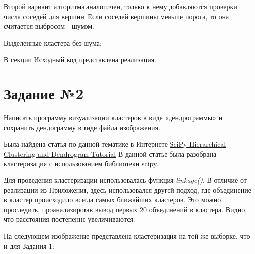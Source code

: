 \documentclass{article} %
\begin{document}
Второй вариант алгоритма аналогичен,
только к нему добавляются проверки числа соседей для вершин.
Если соседей вершины меньше порога, то она считается выбросом - шумом.

\clearpage

Выделенные кластера без шума:

\noindent{}

В секции Исходный код представлена реализация.

\section{Задание №2}

Написать программу визуализации кластеров в виде «дендрограммы» и сохранить
дендограмму в виде файла изображения.

Была найдена статья по данной тематике в Интернете
\href{https://joernhees.de/blog/2015/08/26/scipy-hierarchical-clustering-and-dendrogram-tutorial/}
{SciPy Hierarchical Clustering and Dendrogram Tutorial}
В данной статье была разобрана кластеризация с использованием библиотеки scipy.

Для проведения кластеризации использовалась функция \textit{linkage()}.
В отличие от реализации из Приложения,
здесь использовался другой подход,
где объединение в кластер происходило всегда самых ближайших кластеров.
Это можно проследить, проанализировав вывод первых 20 объединений в кластера.
Видно, что расстояния постепенно увеличиваются.

На следующем изображение представлена кластеризация на той же выборке, что и для Задания 1:
\end{document}

